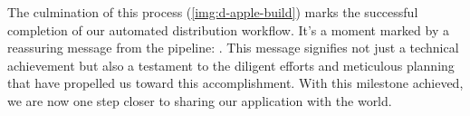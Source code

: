 \noindent The culmination of this process (\cref{img:d-apple-build}) marks the successful completion of our automated 
distribution workflow. It's a moment marked by a reassuring message from the pipeline: . 
This message signifies not just a technical achievement but also a testament to the diligent efforts and meticulous 
planning that have propelled us toward this accomplishment. With this milestone achieved, we are now one step closer 
to sharing our application with the world.

